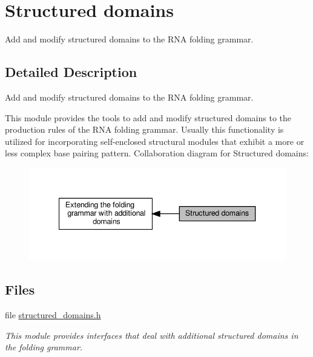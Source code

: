 \hypertarget{group__domains__struc}{}\section{Structured domains}
\label{group__domains__struc}


Add and modify structured domains to the R\+NA folding grammar.  




\subsection{Detailed Description}
Add and modify structured domains to the R\+NA folding grammar. 

This module provides the tools to add and modify structured domains to the production rules of the R\+NA folding grammar. Usually this functionality is utilized for incorporating self-\/enclosed structural modules that exhibit a more or less complex base pairing pattern. Collaboration diagram for Structured domains\+:
\nopagebreak
\begin{figure}[H]
\begin{center}
\leavevmode
\includegraphics[width=340pt]{group__domains__struc}
\end{center}
\end{figure}
\subsection*{Files}
\begin{DoxyCompactItemize}
\item 
file \hyperlink{structured__domains_8h}{structured\+\_\+domains.\+h}
\begin{DoxyCompactList}\small\item\em This module provides interfaces that deal with additional structured domains in the folding grammar. \end{DoxyCompactList}\end{DoxyCompactItemize}
